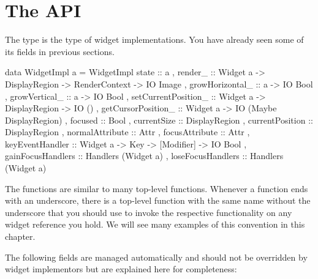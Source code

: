 \section{The  API}
\label{sec:widgetimpl_api}

The  type is the type of widget implementations.  You
have already seen some of its fields in previous sections.

\begin{haskellcode}
 data WidgetImpl a = WidgetImpl {
       state :: a
     , render_ :: Widget a -> DisplayRegion -> RenderContext
               -> IO Image
     , growHorizontal_ :: a -> IO Bool
     , growVertical_ :: a -> IO Bool
     , setCurrentPosition_ :: Widget a -> DisplayRegion -> IO ()
     , getCursorPosition_ :: Widget a -> IO (Maybe DisplayRegion)
     , focused :: Bool
     , currentSize :: DisplayRegion
     , currentPosition :: DisplayRegion
     , normalAttribute :: Attr
     , focusAttribute :: Attr
     , keyEventHandler :: Widget a -> Key -> [Modifier] -> IO Bool
     , gainFocusHandlers :: Handlers (Widget a)
     , loseFocusHandlers :: Handlers (Widget a)
     }
\end{haskellcode}

The  functions are similar to many top-level functions.
Whenever a  function ends with an underscore, there
is a top-level function with the same name without the underscore that
you should use to invoke the respective functionality on any widget
reference you hold.  We will see many examples of this convention in
this chapter.

The following fields are managed automatically and should not be
overridden by widget implementors but are explained here for
completeness:

